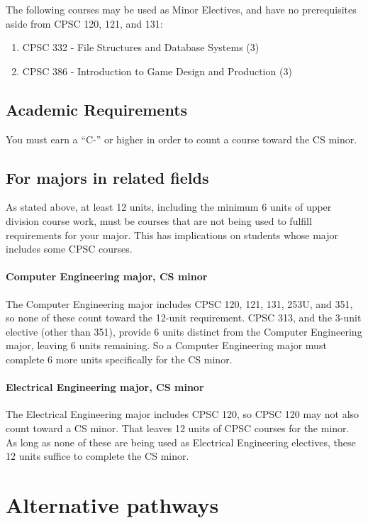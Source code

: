 \documentclass{book}
\begin{document}
The following courses may be used as Minor Electives, and have no prerequisites aside from CPSC 120, 121, and 131:
\begin{enumerate}
\item CPSC 332 - File Structures and Database Systems (3)
\item CPSC 386 - Introduction to Game Design and Production (3)
\end{enumerate}

\section{Academic Requirements}

You must earn a ``C-'' or higher in order to count a course toward the CS minor.

\section{For majors in related fields}

As stated above, at least 12 units, including the minimum 6 units of upper division course work, must be courses that are not being used to fulfill requirements for your major. This has implications on students whose major includes some CPSC courses.

\subsubsection{Computer Engineering major, CS minor}

The Computer Engineering major includes CPSC 120, 121, 131, 253U, and 351, so none of these count toward the 12-unit requirement. CPSC 313, and the 3-unit elective (other than 351), provide 6 units distinct from the Computer Engineering major, leaving 6 units remaining. So a Computer Engineering major must complete 6 more units specifically for the CS minor.

\subsubsection{Electrical Engineering major, CS minor}

The Electrical Engineering major includes CPSC 120, so CPSC 120 may not also count toward a CS minor. That leaves 12 units of CPSC courses for the minor. As long as none of these are being used as Electrical Engineering electives, these 12 units suffice to complete the CS minor.

\chapter{Alternative pathways}
\end{document}
